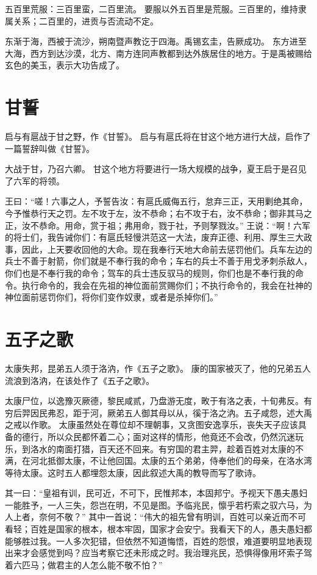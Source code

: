 \documentclass[a4paper,12pt,UTF8,twoside]{ctexbook}
\begin{document}
五百里荒服：三百里蛮，二百里流。
要服以外五百里是荒服。三百里的，维持隶属关系；二百里的，进贡与否流动不定。

东渐于海，西被于流沙，朔南暨声教讫于四海。禹锡玄圭，告厥成功。
东方进至大海，西方到达沙漠，北方、南方连同声教都到达外族居住的地方。于是禹被赐给玄色的美玉，表示大功告成了。

\chapter{甘誓}

启与有扈战于甘之野，作《甘誓》。
启与有扈氏将在甘这个地方进行大战，启作了一篇誓辞叫做《甘誓》。

大战于甘，乃召六卿。
甘这个地方将要进行一场大规模的战争，夏王启于是召见了六军的将领。

王曰：“嗟！六事之人，予誓告汝：有扈氏威侮五行，怠弃三正，天用剿绝其命，今予惟恭行天之罚。左不攻于左，汝不恭命；右不攻于右，汝不恭命；御非其马之正，汝不恭命。用命，赏于祖；弗用命，戮于社，予则孥戮汝。”
王说：“啊！六军的将士们，我告诫你们：有扈氏轻慢洪范这一大法，废弃正德、利用、厚生三大政事，因此，上天要收回他的大命。现在我奉行天地大命前去惩罚他们。兵车左边的兵士不善于射箭，你们就是不奉行我的命令；车右的兵士不善于用戈矛刺杀敌人，你们也是不奉行我的命令；驾车的兵士违反驭马的规则，你们也是不奉行我的命令。执行命令的，我会在先祖的神位面前赏赐你们；不执行命令的，我会在社神的神位面前惩罚你们，将你们变作奴隶，或者是杀掉你们。”

\chapter{五子之歌}

太康失邦，昆弟五人须于洛汭，作《五子之歌》。
康的国家被灭了，他的兄弟五人流浪到洛汭，在该处作了《五子之歌》。

太康尸位，以逸豫灭厥德，黎民咸贰，乃盘游无度，畋于有洛之表，十旬弗反。有穷后羿因民弗忍，距于河，厥弟五人御其母以从，徯于洛之汭。五子咸怨，述大禹之戒以作歌。
太康虽然处在尊位却不理朝事，又贪图安逸享乐，丧失天子应该具备的德行，所以众民都怀着二心；面对这样的情形，他竟还不会改，仍然沉迷玩乐，到洛水的南面打猎，百天还不回来。有穷国的君主羿，趁着百姓对太康的不满，在河北抵御太康，不让他回国。太康的五个弟弟，侍奉他们的母亲，在洛水湾等待太康。这时五人都埋怨太康，因此叙述大禹的教导而写了歌诗。

其一曰：“皇祖有训，民可近，不可下，民惟邦本，本固邦宁。予视天下愚夫愚妇一能胜予，一人三失，怨岂在明，不见是图。予临兆民，懔乎若朽索之驭六马，为人上者，奈何不敬？”
其中一首说：“伟大的祖先曾有明训，百姓可以亲近而不可看轻；百姓是国家的根本，根本牢固，国家才会安宁。我看天下的人，愚夫愚妇都能够胜过我。一人多次犯错，但依然不知道悔悟，百姓的怨恨，难道要明显地表现出来才会感觉到吗？应当考察它还未形成之时。我治理兆民，恐惧得像用坏索子驾着六匹马；做君主的人怎么能不敬不怕？”
\end{document}
